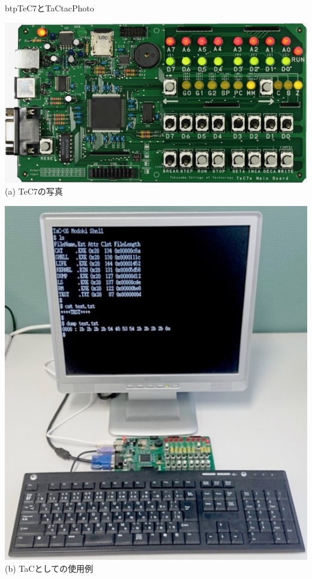 \begin{myfig}{btp}{TeC7とTaC}{tacPhoto}
\begin{minipage}{0.58\columnwidth}
\begin{center}
\includegraphics[scale=0.35]{Photo/TeC7.jpg}\\
(a) TeC7の写真
\end{center}
\end{minipage}
\begin{minipage}{0.38\columnwidth}
\begin{center}
\includegraphics[scale=0.29]{Photo/TaC.jpg}\\
(b) TaCとしての使用例
\end{center}
\end{minipage}
\end{myfig}

